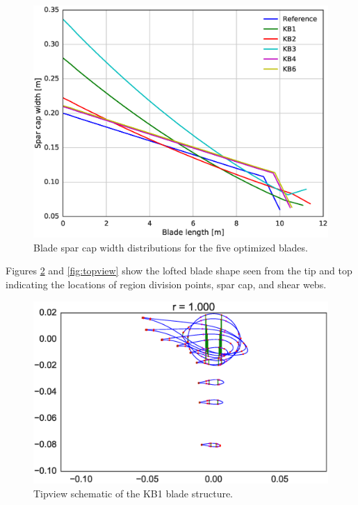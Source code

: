 \begin{figure}[!ht]
\begin{center}
	\includegraphics[width=.85\linewidth]{figures/KBcomp_spar_cap_width.eps}
\end{center}
\caption{Blade spar cap width distributions for the five optimized blades.}
\label{fig:capwidth}
\end{figure}

Figures \ref{fig:tipview} and \ref{fig:topview} show the lofted blade shape seen from the tip and top indicating the locations of region division points, spar cap, and shear webs.

\begin{figure}[!ht]
\begin{center}
	\includegraphics[width=.85\linewidth]{figures/KB1_tipview.eps}
\end{center}
\caption{Tipview schematic of the KB1 blade structure.}
\label{fig:tipview}
\end{figure}

